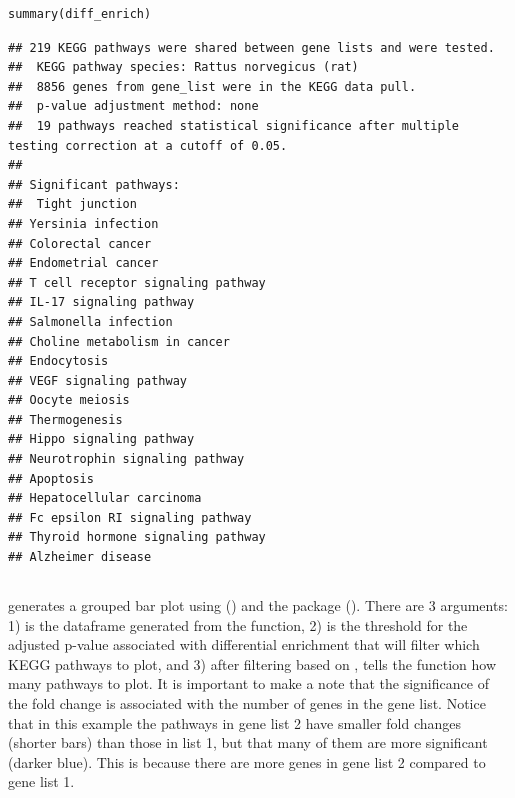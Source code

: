 \documentclass[article]{jss}\usepackage[]{graphicx}\usepackage[]{color}
\makeatletter
\newenvironment{kframe}{%
 \def\at@end@of@kframe{}%
 \ifinner\ifhmode%
  \def\at@end@of@kframe{\end{minipage}}%
  \begin{minipage}{\columnwidth}%
 \fi\fi%
 \def\FrameCommand##1{\hskip\@totalleftmargin \hskip-\fboxsep
 \colorbox{shadecolor}{##1}\hskip-\fboxsep
     \hskip-\linewidth \hskip-\@totalleftmargin \hskip\columnwidth}%
 \MakeFramed {\advance\hsize-\width
   \@totalleftmargin\z@ \linewidth\hsize
   \@setminipage}}%
 {\par\unskip\endMakeFramed%
 \at@end@of@kframe}
\newenvironment{knitrout}{}{} %
\makeatother
\begin{document}
\begin{knitrout}
\color{fgcolor}\begin{kframe}
\begin{lstlisting}[basicstyle=\ttfamily,breaklines=true]
summary(diff_enrich)\end{lstlisting}
\begin{lstlisting}[basicstyle=\ttfamily,breaklines=true]
## 219 KEGG pathways were shared between gene lists and were tested. 
##  KEGG pathway species: Rattus norvegicus (rat)
##  8856 genes from gene_list were in the KEGG data pull. 
##  p-value adjustment method: none
##  19 pathways reached statistical significance after multiple testing correction at a cutoff of 0.05. 
##  
## Significant pathways: 
##  Tight junction
## Yersinia infection
## Colorectal cancer
## Endometrial cancer
## T cell receptor signaling pathway
## IL-17 signaling pathway
## Salmonella infection
## Choline metabolism in cancer
## Endocytosis
## VEGF signaling pathway
## Oocyte meiosis
## Thermogenesis
## Hippo signaling pathway
## Neurotrophin signaling pathway
## Apoptosis
## Hepatocellular carcinoma
## Fc epsilon RI signaling pathway
## Thyroid hormone signaling pathway
## Alzheimer disease
\end{lstlisting}
\end{kframe}
\end{knitrout}

\subsection{}

 generates a grouped bar plot using
 (\cite{Hadley:2106}) and the 
package (\cite{Elio:2019}). There are 3 arguments: 1)
 is the dataframe generated from the
 function, 2)  is the threshold
for the adjusted p-value associated with differential
enrichment that will filter which KEGG pathways to plot, and
3) after filtering based on ,  tells the
function how many pathways to plot. It is important to make
a note that the significance of the fold change is associated
with the number of genes in the gene list. Notice that in this
example the pathways in gene list 2 have smaller fold changes
(shorter bars) than those in list 1, but that many of them are
more significant (darker blue). This is because there are
more genes in gene list 2 compared to gene list 1.
\end{document}
